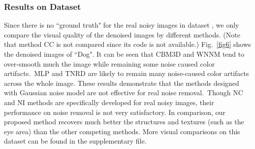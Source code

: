 \documentclass[10pt,twocolumn,letterpaper]{article}
\begin{document}
\subsubsection{Results on Dataset \cite{ncwebsite}}

Since there is no ``ground truth" for the real noisy images in  dataset \cite{ncwebsite}, we only compare the visual quality of the denoised images by different methods. (Note that method CC \cite{crosschannel2016} is not compared since its code is not available.) Fig.\ \ref{fig6} shows the denoised images of ``Dog". It can be seen that CBM3D and WNNM tend to over-smooth much the image while remaining some noise caused color artifacts.\ MLP and TNRD are likely to remain many noise-caused color artifacts across the whole image. These results demonstrate that the methods designed with Gaussian noise model are not effective for real noise removal.\ Though NC and NI methods are specifically developed for real noisy images, their performance on noise removal is not very satisfactory. In comparison, our proposed method recovers much better the structures and textures (such as the eye area) than the other competing methods. More visual comparisons on this dataset \cite{ncwebsite} can be found in the supplementary file.
\end{document}
